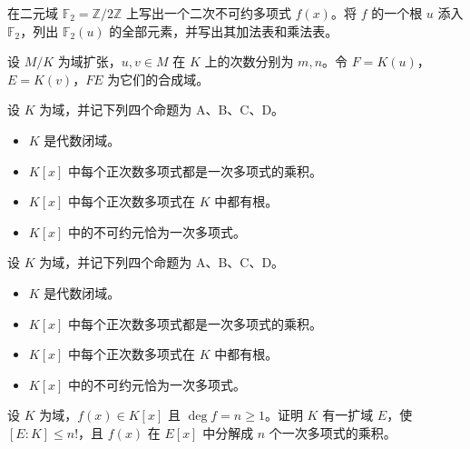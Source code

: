 \noindent\begin{minipage}{\textwidth}
在二元域 $\mathbb{F}_2=\mathbb{Z}/2\mathbb{Z}$ 上写出一个二次不可约多项式 $f(x)$。将 $f$ 的一个根 $u$ 添入 $\mathbb{F}_2$，列出 $\mathbb{F}_2(u)$ 的全部元素，并写出其加法表和乘法表。
\end{minipage}\par\vfill
\newpage
\noindent\begin{minipage}{\textwidth}
设 $M/K$ 为域扩张，$u,v\in M$ 在 $K$ 上的次数分别为 $m,n$。令 $F=K(u)$，$E=K(v)$，$FE$ 为它们的合成域。
\end{minipage}\par\vfill
\noindent\begin{minipage}{\textwidth}
设 $K$ 为域，并记下列四个命题为 A、B、C、D。
\begin{itemize}
\item[A.] $K$ 是代数闭域。
\item[B.] $K[x]$ 中每个正次数多项式都是一次多项式的乘积。
\item[C.] $K[x]$ 中每个正次数多项式在 $K$ 中都有根。
\item[D.] $K[x]$ 中的不可约元恰为一次多项式。
\end{itemize}
\end{minipage}\par\vfill
\noindent\begin{minipage}{\textwidth}
设 $K$ 为域，并记下列四个命题为 A、B、C、D。
\begin{itemize}
\item[A.] $K$ 是代数闭域。
\item[B.] $K[x]$ 中每个正次数多项式都是一次多项式的乘积。
\item[C.] $K[x]$ 中每个正次数多项式在 $K$ 中都有根。
\item[D.] $K[x]$ 中的不可约元恰为一次多项式。
\end{itemize}
\end{minipage}\par\vfill
\newpage
\noindent\begin{minipage}{\textwidth}
设 $K$ 为域，$f(x)\in K[x]$ 且 $\deg f=n\ge1$。证明 $K$ 有一扩域 $E$，使 $[E:K]\le n!$，且 $f(x)$ 在 $E[x]$ 中分解成 $n$ 个一次多项式的乘积。
\end{minipage}\par\vfill
